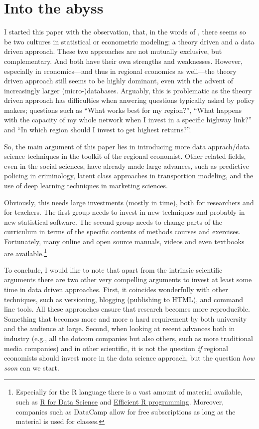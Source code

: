 \documentclass[fleqn,10pt]{SelfArx} %
\begin{document}
\citet{schwabish2014economist}

\section{Into the abyss}

I started this paper with the observation, that, in the words of
\citet{breiman2001statistical}, there seems so be two cultures in statistical or
econometric modeling; a theory driven and a data driven approach. These two
approaches are not mutually exclusive, but complementary. And both have their
own strengths and weaknesses. However, especially in economics---and thus in
regional economics as well---the theory driven approach still seems to be highly
dominant, even with the advent of increasingly larger (micro-)databases.
Arguably, this is problematic as the theory driven approach has difficulties when anwering questions typically
asked by policy makers; questions such as ``What works best for my region?'',
``What happens with the capacity of my whole network when I invest in a specific
highway link?'' and ``In which region should I invest to get highest returns?''.

So, the main argument of this paper lies in introducing more data apprach/data
science techniques in the toolkit of the regional economist. Other related fields, even
in the social sciences, have already made large advances, such as predictive
policing in criminology, latent class approaches in transportion modeling, and
the use of deep learning techniques in marketing sciences. 

Obviously, this needs large investments (mostly in time), both for researchers
and for teachers. The first group needs to invest in new techniques and probably
in new statistical software. The second group needs to change parts of the
curriculum in terms of the specific contents of methods courses and exercises.
Fortunately, many online and open source manuals, videos and even textbooks are
available.\footnote{Especially for the R language there is a vast amount of
  material available, such as \href{http://r4ds.had.co.nz/}{R for Data Science}
  and \href{https://csgillespie.github.io/efficientR/}{Efficient R programming}.
Moreover, companies such as DataCamp allow for free subscriptions as long as the
material is used for classes.} 

To conclude, I would like to note that apart from the intrinsic scientific
arguments there are two other very compelling arguments to invest at least some
time in data driven approaches. First, it coincides wonderfully with other
techniques, such as versioning, blogging (publishing to HTML), and command line
tools. All these approaches ensure that research becomes more reproducible.
Something that becomes more and more a hard requirement by both university and
the audience at large. Second, when looking at recent advances both in industry
(e.g., all the dotcom companies but also others, such as more traditional media
companies) and in other scientific, it is not the question \emph{if} regional economists
should invest more in the data science approach, but the question \emph{how
  soon} can we start.  
\end{document}
